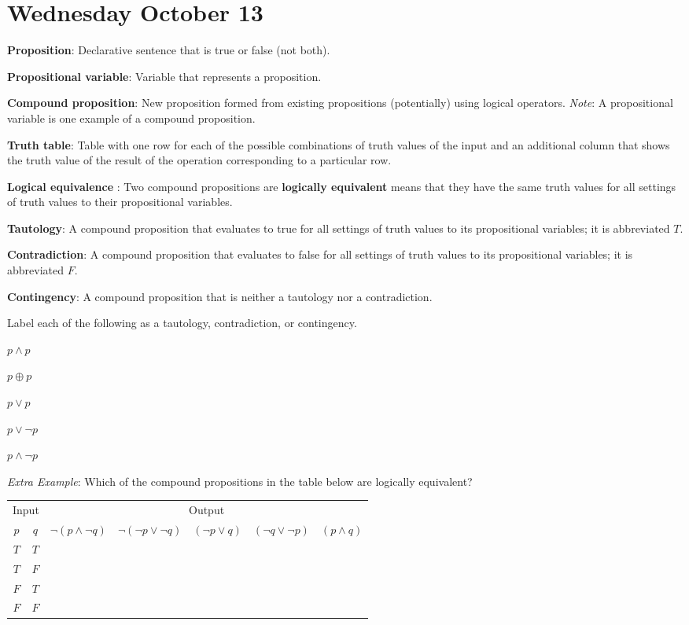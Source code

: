 \documentclass[12pt, oneside]{article}
\begin{document}
\section*{Wednesday October 13}


{\bf Proposition}: Declarative sentence that is true or false (not both).

{\bf Propositional variable}: Variable that represents a proposition.

{\bf Compound proposition}: New proposition formed from existing propositions (potentially) using logical operators.
{\it Note}: A propositional variable is one example of a compound proposition.

{\bf Truth table}: Table with one row for each of the possible combinations of truth values of the input and 
    an additional column that shows the truth value of the result of the operation corresponding to a particular row.
    
 

{\bf Logical equivalence }: Two compound  propositions are {\bf logically  equivalent} means that  they 
have the  same  truth  values for all settings of truth  values to their propositional  variables.

{\bf Tautology}:  A compound proposition that evaluates to true
for all settings of truth  values to its propositional  variables; it is  abbreviated $T$.

{\bf Contradiction}: A compound proposition that  evaluates  to  false 
for  all settings of truth  values to its propositional  variables; it  is abbreviated $F$.

{\bf Contingency}: A compound proposition that is neither a tautology nor a contradiction.
 \vfill


Label each of the following as a tautology, contradiction, or contingency.

$p \land p$

$p \oplus p$

$p \lor p$

$p \lor \lnot p$

$p \land \lnot p$ \vfill


{\it Extra Example}: Which of the  compound propositions in the table below are logically equivalent?
\begin{center}
\begin{tabular}{cc||c|c|c|c|c}
\multicolumn{2}{c||}{Input}  & \multicolumn{5}{c}{Output} \\
$p$ & $q$ & $\lnot (p \land \lnot q)$ & $\lnot (\lnot p  \lor \lnot q)$ &  $(\lnot p \lor  q)$
& $(\lnot q \lor \lnot p)$ & $(p \land q)$  \\
\hline
$T$ & $T$ & &&&&\\
$T$ & $F$ & &&&&\\
$F$ & $T$ & &&&&\\
$F$ & $F$ & &&&&\\
\end{tabular}
\end{center} \vfill
\end{document}
